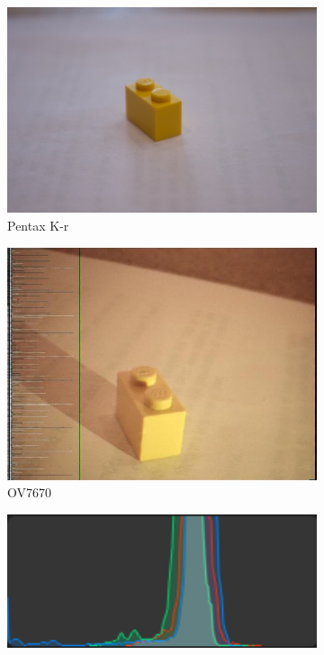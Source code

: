\begin{figure}
\centering
\begin{subfigure}{.5\textwidth}
  \centering
  \includegraphics[width=1\textwidth]{./img/pentax_lego.jpg}
  \caption{Pentax K-r}
\end{subfigure}%
\begin{subfigure}{.5\textwidth}
  \centering
  \includegraphics[width=1\textwidth]{./img/ov7670_lego.jpg}
  \caption{OV7670}
\end{subfigure}
\begin{subfigure}{.5\textwidth}
  \centering
  \includegraphics[width=1\textwidth]{./img/pentax_lego_histogram.png}

\end{subfigure}
\end{figure}
